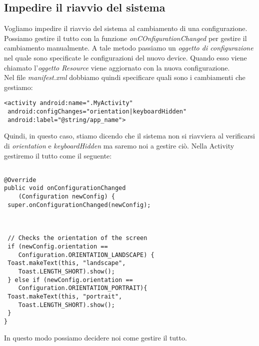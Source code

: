 \subsection{Impedire il riavvio del sistema}
Vogliamo impedire il riavvio del sistema al cambiamento di una configurazione. Possiamo gestire il tutto con la funzione \textit{onCOnfigurationChanged} per gestire il cambiamento manualmente. A tale metodo passiamo un \textit{oggetto di configurazione} nel quale sono specificate le configurazioni del nuovo device. Quando esso viene chiamato l'\textit{oggetto Resource} viene aggiornato con la nuova configurazione.\\
Nel file \textit{manifest.xml} dobbiamo quindi specificare quali sono i cambiamenti che gestiamo:
\begin{lstlisting}[frame=single]  % Start your code-block
<activity android:name=".MyActivity"
 android:configChanges="orientation|keyboardHidden"
 android:label="@string/app_name">
\end{lstlisting}
Quindi, in questo caso, stiamo dicendo che il sistema non si riavviera al verificarsi di \textit{orientation} e \textit{keyboardHidden} ma saremo noi a gestire ciò.
Nella Activity gestiremo il tutto come il seguente:

\begin{lstlisting}[frame=single]  % Start your code-block

@Override
public void onConfigurationChanged
    (Configuration newConfig) {
 super.onConfigurationChanged(newConfig);



 // Checks the orientation of the screen
 if (newConfig.orientation ==
    Configuration.ORIENTATION_LANDSCAPE) {
 Toast.makeText(this, "landscape",
    Toast.LENGTH_SHORT).show();
 } else if (newConfig.orientation ==
    Configuration.ORIENTATION_PORTRAIT){
 Toast.makeText(this, "portrait",
    Toast.LENGTH_SHORT).show();
 }
}
\end{lstlisting}
In questo modo possiamo decidere noi come gestire il tutto.

